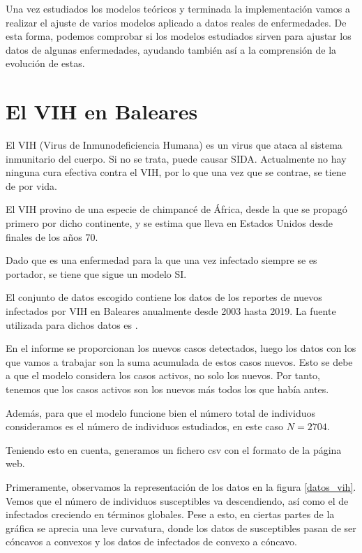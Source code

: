 Una vez estudiados los modelos teóricos y terminada la implementación vamos a realizar el ajuste de varios modelos aplicado a datos reales de enfermedades. De esta forma, podemos comprobar si los modelos estudiados sirven para ajustar los datos de algunas enfermedades, ayudando también así a la comprensión de la evolución de estas.

\section{El VIH en Baleares}

El VIH (Virus de Inmunodeficiencia Humana) es un virus que ataca al sistema inmunitario del cuerpo. Si no se trata, puede causar SIDA. Actualmente no hay ninguna cura efectiva contra el VIH, por lo que una vez que se contrae, se tiene de por vida.

El VIH provino de una especie de chimpancé de África, desde la que se propagó primero por dicho continente, y se estima que lleva en Estados Unidos desde finales de los años 70.

Dado que es una enfermedad para la que una vez infectado siempre se es portador, se tiene que sigue un modelo SI.

El conjunto de datos escogido contiene los datos de los reportes de nuevos infectados por VIH en Baleares anualmente desde 2003 hasta 2019. La fuente utilizada para dichos datos es \cite{datos_vih}.

En el informe se proporcionan los nuevos casos detectados, luego los datos con los que vamos a trabajar son la suma acumulada de estos casos nuevos. Esto se debe a que el modelo considera los casos activos, no solo los nuevos. Por tanto, tenemos que los casos activos son los nuevos más todos los que había antes.

Además, para que el modelo funcione bien el número total de individuos consideramos es el número de individuos estudiados, en este caso $N=2704$.

Teniendo esto en cuenta, generamos un fichero csv con el formato de la página web.

Primeramente, observamos la representación de los datos en la figura \ref{datos_vih}. Vemos que el número de individuos susceptibles va descendiendo, así como el de infectados creciendo en términos globales. Pese a esto, en ciertas partes de la gráfica se aprecia una leve curvatura, donde los datos de susceptibles pasan de ser cóncavos a convexos y los datos de infectados de convexo a cóncavo.


